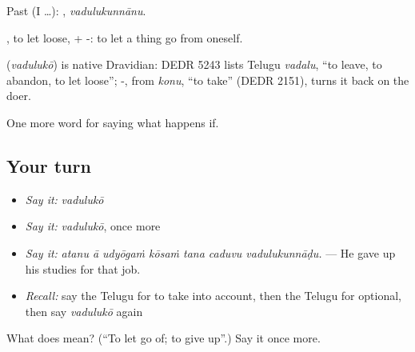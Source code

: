 Past (I …): , \emph{vadulukunnānu}.

, to let loose, + -: to let a thing go from oneself.

\begin{cousinweb}
\textbf{} (\emph{vadulukō}) is native Dravidian: DEDR 5243 lists Telugu \emph{vadalu}, \textquotedblleft{}to leave, to abandon, to let loose\textquotedblright{}; -, from \emph{konu}, \textquotedblleft{}to take\textquotedblright{} (DEDR 2151), turns it back on the doer.
\end{cousinweb}

\begin{grammarlens}[title={What you've built}]
One more word for saying what happens if.
\end{grammarlens}

\subsection*{Your turn}
\begin{itemize}
\raggedright
  \item \emph{Say it:} \emph{vadulukō}
  \item \emph{Say it:} \emph{vadulukō}, once more
  \item \emph{Say it:} \emph{atanu ā udyōgaṁ kōsaṁ tana caduvu vadulukunnāḍu.} — He gave up his studies for that job.
  \item \emph{Recall:} say the Telugu for to take into account, then the Telugu for optional, then say \emph{vadulukō} again
\end{itemize}

\begin{tcolorbox}[breakable,colback=teal!4,colframe=teal!35!black,title={Before you move on}]
What does  mean? (\textquotedblleft{}To let go of; to give up\textquotedblright{}.) Say it once more.
\end{tcolorbox}
